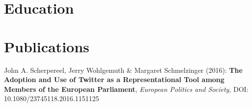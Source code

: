 \documentclass[10pt,a4paper,merriweather]{moderncv}        %
\begin{document}

\section{Education}

\section{Publications}
\small John A. Scherpereel, Jerry Wohlgemuth \& Margaret Schmelzinger (2016): \textbf{The Adoption and Use of Twitter as a Representational
Tool among Members of the European Parliament}, \textit{European Politics and Society}, DOI: 10.1080/23745118.2016.1151125

\clearpage





\end{document}
